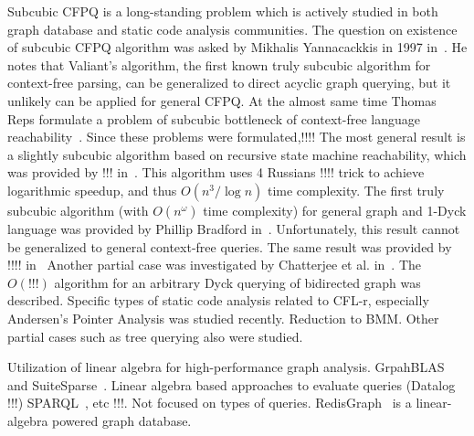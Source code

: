 Subcubic CFPQ is a long-standing problem which is actively studied in both graph database and static code analysis communities.
The question on existence of subcubic CFPQ algorithm was asked by Mikhalis Yannacackkis in 1997 in~\cite{!!!}. He notes that Valiant's algorithm, the first known truly subcubic algorithm for context-free parsing, can be generalized to direct acyclic graph querying, but it unlikely can be applied for general CFPQ. 
At the almost same time Thomas Reps formulate a problem of subcubic bottleneck of context-free language reachability~\cite{!!!}.
Since these problems were formulated,!!!!
The most general result is a slightly subcubic algorithm based on recursive state machine reachability, which was provided by !!! in~\cite{rsm:analysis:10.1007/3-540-44585-4_18}. This algorithm uses 4 Russians !!!! trick to achieve logarithmic speedup, and thus $O(n^3/\log{n})$ time complexity. 
The first truly subcubic algorithm (with $O(n^\omega)$ time complexity) for general graph and 1-Dyck language was provided by Phillip Bradford in~\cite{Bradford2017EfficientEP}. Unfortunately, this result cannot be generalized to general context-free queries.
The same result was provided by !!!! in~\cite{zhang2020conditional,pavlogiannis2020finegrained}
Another partial case was investigated by Chatterjee et al. in~\cite{10.1145/3158118}.
The $O(!!!)$ algorithm for an arbitrary Dyck querying of bidirected graph was described.
Specific types of static code analysis related to CFL-r, especially Andersen's Pointer Analysis was studied recently. Reduction to BMM.
Other partial cases such as tree querying also were studied.

Utilization of linear algebra for high-performance graph analysis.
GrpahBLAS~\cite{!!!} and SuiteSparse~\cite{!!!}.
Linear algebra based approaches to evaluate queries (Datalog !!!) SPARQL~\cite{10.1145/3302424.3303962,DBLP:journals/corr/MetzlerM15a}, etc !!!. 
Not focused on types of queries.
RedisGraph~\cite{!!!} is a linear-algebra powered graph database.